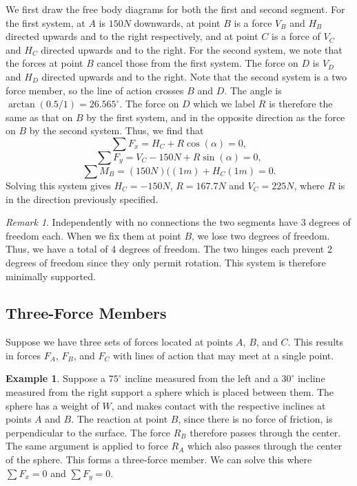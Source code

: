 \documentclass[11pt]{article}
\theoremstyle{plain} %
\theoremstyle{definition}
\theoremstyle{example}
\newtheorem*{example}{Example}
\theoremstyle{remark}
\newtheorem*{remark}{Remark}
\begin{document}
We first draw the free body diagrams for both the first and second segment. For the first system, at $A$ is $150N$ downwards, at point $B$ is a force $V_B$ and $H_B$ directed upwards and to the right respectively, and at point $C$ is a force of $V_C$ and $H_C$ directed upwards and to the right. For the second system, we note that the forces at point $B$ cancel those from the first system. The force on $D$ is $V_D$ and $H_D$ directed upwards and to the right. Note that the second system is a two force member, so the line of action crosses $B$ and $D$. The angle is $\arctan(0.5/1) = 26.565^{\circ}$. The force on $D$ which we label $R$ is therefore the same as that on $B$ by the first system, and in the opposite direction as the force on $B$ by the second system. Thus, we find that
$$\sum F_x = H_C + R\cos(\alpha) = 0,$$
$$\sum F_y = V_C -150N + R\sin(\alpha) = 0,$$
$$\sum M_B = (150N)((1m) + H_C(1m) = 0.$$
Solving this system gives $H_C = -150N$, $R = 167.7N$ and $V_C = 225N$, where $R$ is in the direction previously specified. 

\begin{remark}
Independently with no connections the two segments have 3 degrees of freedom each. When we fix them at point $B$, we lose two degrees of freedom. Thus, we have a total of 4 degrees of freedom. The two hinges each prevent 2 degrees of freedom since they only permit rotation. This system is therefore minimally supported. 
\end{remark}

\subsection{Three-Force Members}

Suppose we have three sets of forces located at points $A$, $B$, and $C$. This results in forces $F_A$, $F_B$, and $F_C$ with lines of action that may meet at a single point. 

\begin{example}
Suppose a $75^{\circ}$ incline measured from the left and a $30^{\circ}$ incline measured from the right support a sphere which is placed between them. The sphere has a weight of $W$, and makes contact with the respective inclines at points $A$ and $B$. The reaction at point $B$, since there is no force of friction, is perpendicular to the surface. The force $R_B$ therefore passes through the center. The same argument is applied to force $R_A$ which also passes through the center of the sphere. This forms a three-force member. We can solve this where $\sum F_x = 0$ and $\sum F_y = 0$. 
\end{example}
\end{document}
